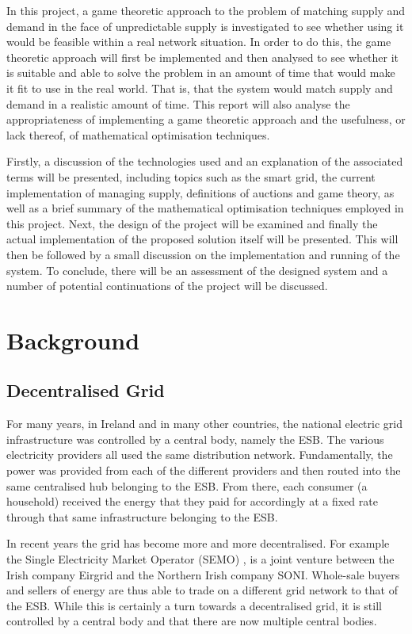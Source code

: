 \documentclass[a4paper, notitlepage]{report}
\begin{document}
In this project, a game theoretic approach to the problem of matching supply and
demand in the face of unpredictable supply is investigated to see whether using
it would be feasible within a real network situation. In order to do this, the
game theoretic approach will first be implemented and then analysed to see
whether it is suitable and able to solve the problem in an amount of time that
would make it fit to use in the real world. That is, that the system would match
supply and demand in a realistic amount of time. This report will also analyse
the appropriateness of implementing a game theoretic approach and the
usefulness, or lack thereof, of mathematical optimisation techniques.

Firstly, a discussion of the technologies used and an explanation of the
associated terms will be presented, including topics such as the smart grid, the
current implementation of managing supply, definitions of auctions and game
theory, as well as a brief summary of the mathematical optimisation techniques
employed in this project. Next, the design of the project will be examined and
finally the actual implementation of the proposed solution itself will be
presented. This will then be followed by a small discussion on the
implementation and running of the system. To conclude, there will be an
assessment of the designed system and a number of potential continuations of the
project will be discussed.
\part{Background}
\label{sec:orgea38783}
\chapter{Decentralised Grid}
\label{sec:orgadbbe46}
For many years, in Ireland and in many other countries, the national electric grid
infrastructure was controlled by a central body, namely the ESB. The various
electricity providers all used the same distribution network. Fundamentally, the
power was provided from each of the different providers and then routed into the
same centralised hub belonging to the ESB. From there, each consumer (a
household) received the energy that they paid for accordingly at a fixed rate
through that same infrastructure belonging to the ESB.

In recent years the grid has become more and more decentralised. For example the
Single Electricity Market Operator (SEMO) \cite{semo}, is a joint venture between
the Irish company Eirgrid and the Northern Irish company SONI. Whole-sale buyers
and sellers of energy are thus able to trade on a different grid network to that
of the ESB. While this is certainly a turn towards a decentralised grid, it is
still controlled by a central body and that there are now multiple central
bodies.
\end{document}
